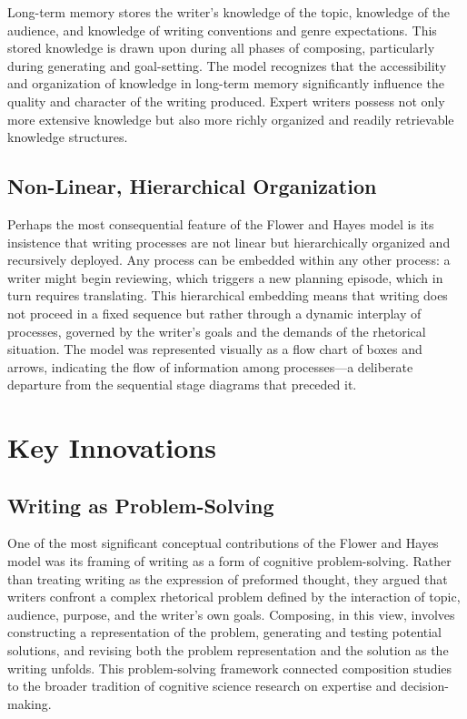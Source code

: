 \documentclass[12pt]{article}
\begin{document}
Long-term memory stores the writer's knowledge of the topic, knowledge of the audience, and knowledge of writing conventions and genre expectations. This stored knowledge is drawn upon during all phases of composing, particularly during generating and goal-setting. The model recognizes that the accessibility and organization of knowledge in long-term memory significantly influence the quality and character of the writing produced. Expert writers possess not only more extensive knowledge but also more richly organized and readily retrievable knowledge structures.

\subsection{Non-Linear, Hierarchical Organization}

Perhaps the most consequential feature of the Flower and Hayes model is its insistence that writing processes are not linear but hierarchically organized and recursively deployed. Any process can be embedded within any other process: a writer might begin reviewing, which triggers a new planning episode, which in turn requires translating. This hierarchical embedding means that writing does not proceed in a fixed sequence but rather through a dynamic interplay of processes, governed by the writer's goals and the demands of the rhetorical situation. The model was represented visually as a flow chart of boxes and arrows, indicating the flow of information among processes---a deliberate departure from the sequential stage diagrams that preceded it.

\section{Key Innovations}

\subsection{Writing as Problem-Solving}

One of the most significant conceptual contributions of the Flower and Hayes model was its framing of writing as a form of cognitive problem-solving. Rather than treating writing as the expression of preformed thought, they argued that writers confront a complex rhetorical problem defined by the interaction of topic, audience, purpose, and the writer's own goals. Composing, in this view, involves constructing a representation of the problem, generating and testing potential solutions, and revising both the problem representation and the solution as the writing unfolds. This problem-solving framework connected composition studies to the broader tradition of cognitive science research on expertise and decision-making.
\end{document}
